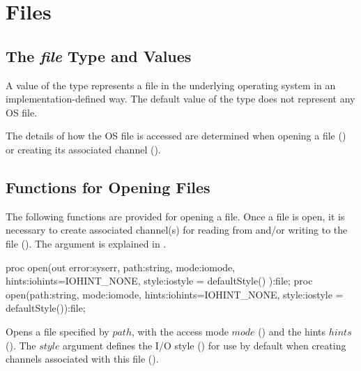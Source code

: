 

\section{Files}
\label{IO_files}


\subsection{The {\em file} Type and Values}
\label{IO_file_type}


A value of the  type represents a file in the underlying
operating system in an implementation-defined way. The default value
of the  type does not represent any OS file.

The details of how the OS file is accessed are determined
when opening a file ()
or creating its associated channel ().


\subsection{Functions for Opening Files}
\label{IO_open_file}

The following functions are provided for opening a file.
Once a file is open, it is necessary to create associated channel(s)
for reading from and/or writing to the file ().
The  argument is explained in .

\begin{protohead}
proc open(out error:syserr, path:string, mode:iomode, hints:iohints=IOHINT_NONE, style:iostyle = defaultStyle()
          ):file;
proc open(path:string, mode:iomode, hints:iohints=IOHINT_NONE, style:iostyle = defaultStyle()):file;
\end{protohead}
\begin{protobody}
Opens a file specified by $path$, with
the access mode $mode$ ()
and the hints $hints$ ().
The $style$ argument defines the I/O style ()
for use by default when creating channels associated with this file
().
\end{protobody}

